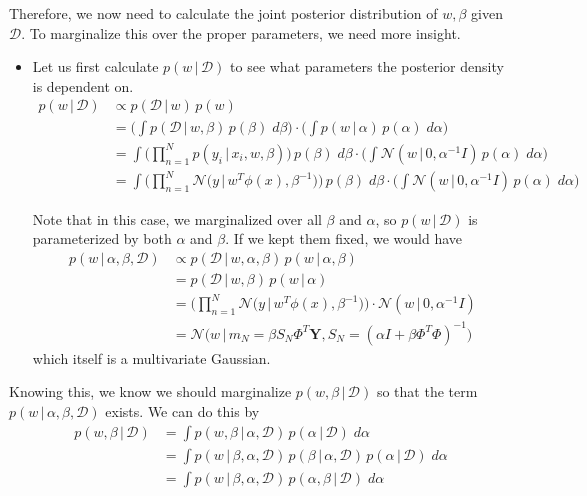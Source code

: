   Therefore, we now need to calculate the joint posterior distribution of $w, \beta$ given $\mathcal{D}$. To marginalize this over the proper parameters, we need more insight.
  \begin{itemize}
    \item Let us first calculate $p(w\,|\,\mathcal{D})$ to see what parameters the posterior density is dependent on.
    \begin{align*}
      p(w\,|\,\mathcal{D}) & \propto p(\mathcal{D} \,|\,w)\, p(w) \\
      & = \Bigg( \int p(\mathcal{D}\,|\,w, \beta) \, p( \beta) \; d\beta \Bigg) \cdot \Bigg( \int p(w\,|\,\alpha)\, p(\alpha)\; d\alpha \Bigg) \\
      & = \int \bigg( \prod_{n=1}^N p(y_i\,|\,x_i, w, \beta)\bigg)\, p(\beta) \; d\beta \cdot \Bigg( \int \mathcal{N}(w\,|\,0, \alpha^{-1} I)\, p(\alpha)\; d\alpha \Bigg) \\
      & = \int \bigg( \prod_{n=1}^N \mathcal{N}\big( y\,|\, w^T \phi(x), \beta^{-1} \big) \bigg)\, p(\beta) \; d\beta \cdot \Bigg( \int \mathcal{N}(w\,|\,0, \alpha^{-1} I)\, p(\alpha)\; d\alpha \Bigg)
    \end{align*}
    
    Note that in this case, we marginalized over all $\beta$ and $\alpha$, so $p(w\,|\,\mathcal{D})$ is parameterized by both $\alpha$ and $\beta$. If we kept them fixed, we would have
    \begin{align*}
      p(w\,|\,\alpha, \beta, \mathcal{D}) & \propto p(\mathcal{D}\,|\,w, \alpha, \beta) \, p(w\,|\,\alpha, \beta) \\
      & = p(\mathcal{D}\,|\,w, \beta) \, p(w\,|\,\alpha) \\
      & = \bigg( \prod_{n=1}^N \mathcal{N}\big( y\,|\, w^T \phi(x), \beta^{-1} \big) \bigg) \cdot \mathcal{N}(w\,|\,0, \alpha^{-1} I) \\
      & = \mathcal{N}\big( w\,|\, m_N = \beta S_N \Phi^T \mathbf{Y}, S_N = (\alpha I + \beta \Phi^T \Phi)^{-1} \big)
    \end{align*}
    which itself is a multivariate Gaussian.
  \end{itemize}

  Knowing this, we know we should marginalize $p(w, \beta\,|\,\mathcal{D})$ so that the term $p(w\,|\, \alpha, \beta, \mathcal{D})$ exists. We can do this by
  \begin{align*}
    p(w, \beta\,|\,\mathcal{D}) & = \int p(w, \beta\,|\,\alpha, \mathcal{D}) \, p(\alpha\,|\,\mathcal{D})\; d\alpha \\
    & = \int p(w\,|\,\beta, \alpha, \mathcal{D}) \, p(\beta \,|\, \alpha, \mathcal{D}) \, p(\alpha\,|\,\mathcal{D}) \; d\alpha \\
    & = \int p(w\,|\, \beta, \alpha, \mathcal{D}) \, p(\alpha, \beta\,|\,\mathcal{D}) \; d\alpha
  \end{align*}

